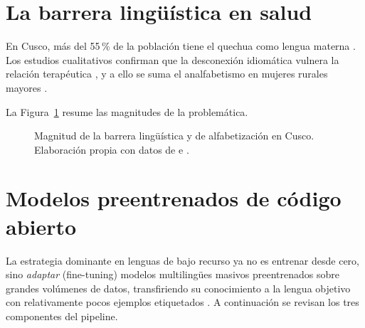 \documentclass[12pt,a4paper]{article}
\begin{document}
\section{La barrera ling{\"u}{\'i}stica en salud}
En Cusco, m{\'a}s del 55\,\% de la poblaci{\'o}n tiene el quechua como lengua materna
\parencite{essalud2023}. Los estudios cualitativos confirman que la desconexi{\'o}n
idiom{\'a}tica vulnera la relaci{\'o}n terap{\'e}utica \parencite{begazo2026,cuaila2022}, y a
ello se suma el analfabetismo en mujeres rurales mayores \parencite{inei2023,dispurse2023}.

La Figura~\ref{fig:barreras} resume las magnitudes de la problem{\'a}tica.

\begin{figure}[H]
\centering
{}
\caption{Magnitud de la barrera ling{\"u}{\'i}stica y de alfabetizaci{\'o}n en Cusco. Elaboraci{\'o}n propia con datos de \textcite{essalud2023} e \textcite{inei2023}.}
\label{fig:barreras}
\end{figure}

\section{Modelos preentrenados de c{\'o}digo abierto}
La estrategia dominante en lenguas de bajo recurso ya no es entrenar desde cero, sino
\emph{adaptar} (fine-tuning) modelos multiling{\"u}es masivos preentrenados sobre grandes
vol{\'u}menes de datos, transfiriendo su conocimiento a la lengua objetivo con relativamente
pocos ejemplos etiquetados \parencite{pratap2024mms}. A continuaci{\'o}n se revisan los tres
componentes del pipeline.
\end{document}
